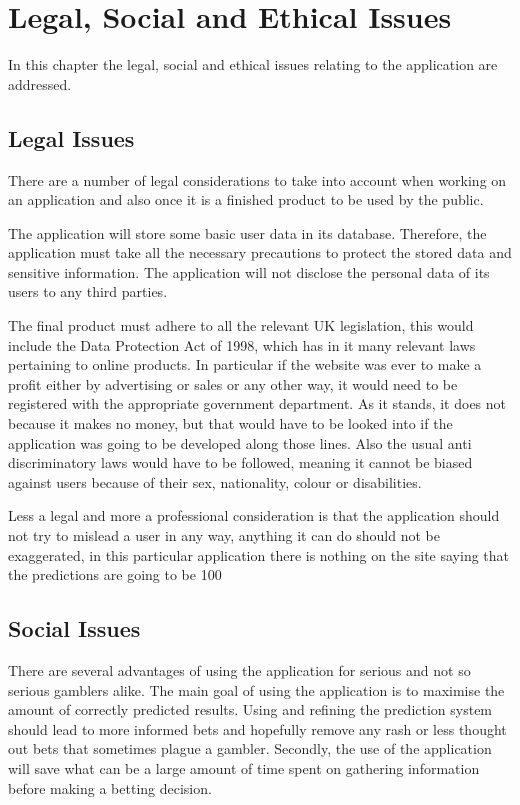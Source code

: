 \chapter{Legal, Social and Ethical Issues}
\label{ch:lesp_issues}
In this chapter the legal, social and ethical issues relating to the application are addressed.  

\section{Legal Issues}
\label{sec:legalissues_lesp}
There are a number of legal considerations to take into account when working on an application and also once it is a finished product to be used by the public.

The application will store some basic user data in its database. Therefore, the application must take all the necessary precautions to protect the stored data and sensitive information. The application will not disclose the personal data of its users to any third parties.

The final product must adhere to all the relevant UK legislation, this would include the Data Protection Act of 1998, which has in it many relevant laws pertaining to online products.  In particular if the website was ever to make a profit either by advertising or sales or any other way, it would need to be registered with the appropriate government department. As it stands, it does not because it makes no money, but that would have to be looked into if the application was going to be developed along those lines. Also the usual anti discriminatory laws would have to be followed, meaning it cannot be biased against users because of their sex, nationality, colour or disabilities.

Less a legal and more a professional consideration is that the application should not try to mislead a user in any way, anything it can do should not be exaggerated, in this particular application there is nothing on the site saying that the predictions are going to be 100%

\section{Social Issues}
\label{sec:socialissues_lesp}
There are several advantages of using the application for serious and not so serious gamblers alike. The main goal of using the application is to maximise the amount of correctly predicted results. Using and refining the prediction system should lead to more informed bets and hopefully remove any rash or less thought out bets that sometimes plague a gambler. Secondly, the use of  the application will save what can be a large amount of  time spent on gathering information before making a betting decision.


